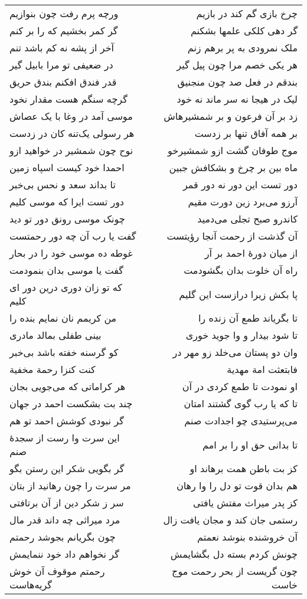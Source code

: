 \begin{center}
\begin{longtable}{l p{0.5cm} r}
ورچه پرم رفت چون بنوازیم
&&
چرخ بازی گم کند در بازیم
\\
گر کمر بخشیم که را بر کنم
&&
گر دهی کلکی علمها بشکنم
\\
آخر از پشه نه کم باشد تنم
&&
ملک نمرودی به پر برهم زنم
\\
در ضعیفی تو مرا بابیل گیر
&&
هر یکی خصم مرا چون پیل گیر
\\
قدر فندق افکنم بندق حریق
&&
بندقم در فعل صد چون منجنیق
\\
گرچه سنگم هست مقدار نخود
&&
لیک در هیجا نه سر ماند نه خود
\\
موسی آمد در وغا با یک عصاش
&&
زد بر آن فرعون و بر شمشیرهاش
\\
هر رسولی یک‌تنه کان در زدست
&&
بر همه آفاق تنها بر زدست
\\
نوح چون شمشیر در خواهید ازو
&&
موج طوفان گشت ازو شمشیرخو
\\
احمدا خود کیست اسپاه زمین
&&
ماه بین بر چرخ و بشکافش جبین
\\
تا بداند سعد و نحس بی‌خبر
&&
دور تست این دور نه دور قمر
\\
دور تست ایرا که موسی کلیم
&&
آرزو می‌برد زین دورت مقیم
\\
چونک موسی رونق دور تو دید
&&
کاندرو صبح تجلی می‌دمید
\\
گفت یا رب آن چه دور رحمتست
&&
آن گذشت از رحمت آنجا رؤیتست
\\
غوطه ده موسی خود را در بحار
&&
از میان دورهٔ احمد بر آر
\\
گفت یا موسی بدان بنمودمت
&&
راه آن خلوت بدان بگشودمت
\\
که تو زان دوری درین دور ای کلیم
&&
پا بکش زیرا درازست این گلیم
\\
من کریمم نان نمایم بنده را
&&
تا بگریاند طمع آن زنده را
\\
بینی طفلی بمالد مادری
&&
تا شود بیدار و وا جوید خوری
\\
کو گرسنه خفته باشد بی‌خبر
&&
وان دو پستان می‌خلد زو مهر در
\\
کنت کنزا رحمة مخفیة
&&
فابتعثت امة مهدیة
\\
هر کراماتی که می‌جویی بجان
&&
او نمودت تا طمع کردی در آن
\\
چند بت بشکست احمد در جهان
&&
تا که یا رب گوی گشتند امتان
\\
گر نبودی کوشش احمد تو هم
&&
می‌پرستیدی چو اجدادت صنم
\\
این سرت وا رست از سجدهٔ صنم
&&
تا بدانی حق او را بر امم
\\
گر بگویی شکر این رستن بگو
&&
کز بت باطن همت برهاند او
\\
مر سرت را چون رهانید از بتان
&&
هم بدان قوت تو دل را وا رهان
\\
سر ز شکر دین از آن برتافتی
&&
کز پدر میراث مفتش یافتی
\\
مرد میراثی چه داند قدر مال
&&
رستمی جان کند و مجان یافت زال
\\
چون بگریانم بجوشد رحمتم
&&
آن خروشنده بنوشد نعمتم
\\
گر نخواهم داد خود ننمایمش
&&
چونش کردم بسته دل بگشایمش
\\
رحمتم موقوف آن خوش گریه‌هاست
&&
چون گریست از بحر رحمت موج خاست
\\
\end{longtable}
\end{center}
